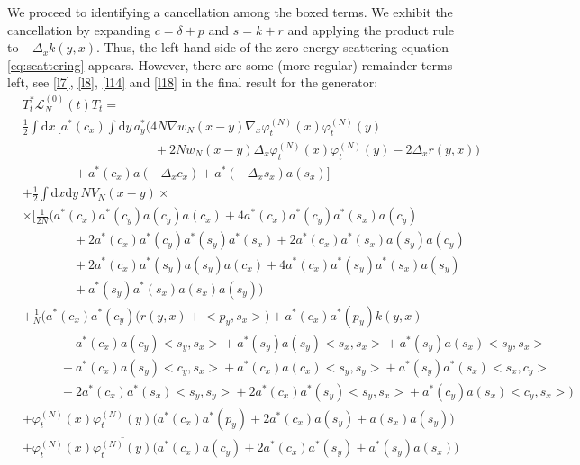 \documentclass[11pt,a4paper,DIV11]{scrartcl}	%
\newcommand{\di}{\textrm{d}}		%
\newcommand{\Lcal}{\mathcal{L}}		%
\newcommand{\scal}[2]{\big<#1,#2\big>} %
\newcommand{\cc}[1]{\overline{#1}}	%
\newcommand{\ph}{\varphi_t^{(N)}}	%
\newcommand{\eqr}[1]{\eqref{eq:#1}}			%
\begin{document}
We proceed to identifying a cancellation among the boxed terms. We exhibit the
cancellation by expanding $c = \delta + p$ and $s = k + r$ and applying the
product rule to $-\Delta_x k(y,x)$. Thus, the left hand side of the
zero-energy scattering equation \eqr{scattering} appears. However, there are
some (more regular) remainder terms left, see \eqref{l7}, \eqref{l8},
\eqref{l14} and \eqref{l18} in the final result for the generator:
\begin{align}
& T^*_t \Lcal_N^{(0)}(t) T_t = \nonumber \\ 
& \frac{1}{2} \int \di x\, \bigg[ a^*(c_x) \int \di y\, a^*_y \Big(4 N \nabla w_N(x-y) \nabla_x \ph(x) \ph(y) \label{l7}\\
& \qquad\qquad \qquad\qquad \qquad \ \	+ 2Nw_N(x-y) \Delta_x \ph(x) \ph(y) - 2\Delta_x r(y,x) \Big) \label{l8}\\
& \qquad\qquad 			+ a^*(c_x) a(-\Delta_x c_x) + a^*(-\Delta_x s_x) a(s_x) \bigg] \label{l9} \\
& + \frac{1}{2}\int \di x \di y\, NV_N(x-y) \times \nonumber \\
& \times \Big[   \frac{1}{2N}\bigg( a^*(c_x) a^*(c_y) a(c_y) a(c_x) + 4 a^*(c_x) a^*(c_y) a^*(s_x) a(c_y) \label{l10}\\
				      & \qquad\qquad + 2 a^*(c_x) a^*(c_y) a^*(s_y) a^*(s_x) + 2 a^*(c_x) a^*(s_x) a(s_y) a(c_y) \label{l11}\\
				      & \qquad\qquad + 2 a^*(c_x) a^*(s_y) a(s_y) a(c_x) + 4 a^*(c_x) a^*(s_y) a^*(s_x) a(s_y) \label{l12}\\
				      & \qquad\qquad + a^*(s_y) a^*(s_x) a(s_x) a(s_y) \bigg) \label{l13}\\
& + \frac{1}{N}\bigg(   a^*(c_x) a^*(c_y) \Big( r(y,x) + \scal{p_y}{s_x} \Big) + a^*(c_x) a^*(p_y) k(y,x) \label{l14} \\
      & \qquad\quad + a^*(c_x) a(c_y) \scal{s_y}{s_x} + a^*(s_y) a(s_y) \scal{s_x}{s_x} + a^*(s_y) a(s_x) \scal{s_y}{s_x} \label{l15}\\
      & \qquad\quad + a^*(c_x) a(s_y) \scal{c_y}{s_x} + a^*(c_x) a(c_x) \scal{s_y}{s_y} + a^*(s_y) a^*(s_x) \scal{s_x}{c_y} \label{l16}\\
      & \qquad\quad + 2a^*(c_x) a^*(s_x) \scal{s_y}{s_y} + 2a^*(c_x)a^*(s_y) \scal{s_y}{s_x} + a^*(c_y) a(s_x) \scal{c_y}{s_x}    \bigg) \label{l17}\\
& + \ph(x)\ph(y) \Big( a^*(c_x) a^*(p_y) + 2 a^*(c_x) a(s_y) +a(s_x) a(s_y) \Big) \label{l18}\\
& + \ph(x) \cc{\ph(y)} \Big( a^*(c_x) a(c_y) + 2 a^*(c_x) a^*(s_y) + a^*(s_y) a(s_x) \Big) \label{l19}\\

\end{align}
\end{document}
